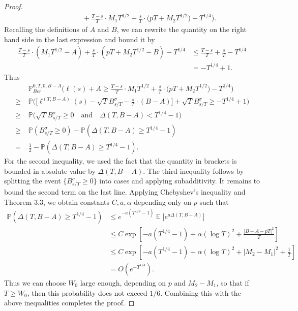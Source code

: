 \documentclass[12pt]{article}
\DeclareMathOperator{\ex}{\mathbb{E}}
\begin{document}
\begin{proof}
\begin{align*}
		&\qquad\qquad + \frac{T-s}{T} \cdot M_1 T^{1/2} + \frac{s}{T} \cdot \big(p T + M_2 T^{1/2}\big) - T^{1/4} \Big).
		\end{align*}
		Recalling the definitions of $A$ and $B$, we can rewrite the quantity on the right hand side in the last expression and bound it by
		\begin{align*}
		\frac{T-s}{T}\cdot(M_1T^{1/2}-A) + \frac{s}{T}\cdot(pT + M_2T^{1/2} - B) - T^{1/4} &\leq  \frac{T-s}{T} + \frac{s}{T} - T^{1/4}\\
		& = -T^{1/4} + 1.
		\end{align*}
		Thus
		\begin{align*}
		&\mathbb{P}^{0,T,0,B-A}_{Ber}\Big( \ell(s) + A  \geq \frac{T-s}{T} \cdot M_1 T^{1/2} + \frac{s}{T} \cdot \big(p T + M_2 T^{1/2}\big) - T^{1/4} \Big)\\
		\geq \; & \mathbb{P}\Big( \Big[\ell^{(T,B-A)}(s) - \sqrt{T} B^\sigma_{s/T} - \frac{s}{T}\cdot(B-A)\Big] + \sqrt{T}B^\sigma_{s/T} \geq -T^{1/4} + 1 \Big)\\
		\geq \; & \mathbb{P}\Big( \sqrt{T}B^\sigma_{s/T} \geq 0 \quad \mathrm{and} \quad \Delta(T,B-A) < T^{1/4} - 1 \Big)\\
		\geq \; & \mathbb{P}\left( B^\sigma_{s/T} \geq 0 \right) - \mathbb{P}\left( \Delta(T,B-A) \geq T^{1/4} - 1 \right)\\
		= \; & \frac{1}{2} - \mathbb{P}\left( \Delta(T,B-A) \geq T^{1/4} - 1 \right).
		\end{align*}
		For the second inequality, we used the fact that the quantity in brackets is bounded in absolute value by $\Delta(T,B-A)$. The third inequality follows by splitting the event $\{B^\sigma_{s/T}\geq 0\}$ into cases and applying subadditivity. It remains to bound the second term on the last line. Applying Chebyshev's inequality and Theorem 3.3, we obtain constants $C,a,\alpha$ depending only on $p$ such that
		\begin{align*}
		\mathbb{P}\left( \Delta(T,B-A) \geq T^{1/4} - 1 \right) & \leq e^{-a(T^{1/4} - 1)} \ex\Big[ e^{a\Delta(T,B-A)} \Big]\\
		&\leq C \exp\left[ -a(T^{1/4}-1) + \alpha(\log T)^2 + \frac{|B-A-pT|^2}{T} \right]\\
		&\leq C \exp\left[ -a(T^{1/4}-1) + \alpha(\log T)^2 + |M_2-M_1|^2 + \frac{1}{T} \right]\\
		&= O(e^{-T^{1/4}}).
		\end{align*}
		Thus we can choose $W_0$ large enough, depending on $p$ and $M_2-M_1$, so that if $T \geq W_0$, then this probability does not exceed $1/6$. Combining this with the above inequalities completes the proof.
		
	\end{proof}
\end{document}
